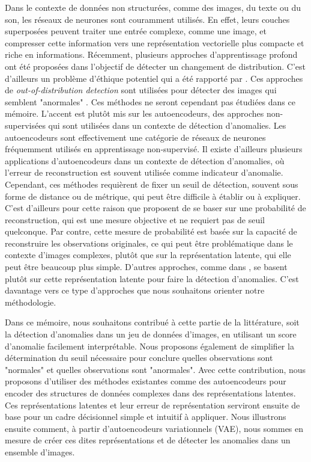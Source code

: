 Dans le contexte de données non structurées, comme des images, du texte ou du son, les réseaux de neurones sont couramment utilisés. En effet, leurs couches superposées peuvent traiter une entrée complexe, comme une image, et compresser cette information vers une représentation vectorielle plus compacte et riche en informations. Récemment, plusieurs approches d'apprentissage profond ont été proposées dans l'objectif de détecter un changement de distribution. C'est d'ailleurs un problème d'éthique potentiel qui a été rapporté par \cite{amodei2016concrete}. Ces approches de \textit{out-of-distribution detection} sont utilisées pour détecter des images qui semblent "anormales" \citep{ren2019likelihood}. Ces méthodes ne seront cependant pas étudiées dans ce mémoire. L'accent est plutôt mis sur les autoencodeurs, des approches non-supervisées qui sont utilisées dans un contexte de détection d'anomalies. Les autoencodeurs sont effectivement une catégorie de réseaux de neurones fréquemment utilisés en apprentissage non-supervisé. Il existe d'ailleurs plusieurs applications d'autoencodeurs dans un contexte de détection d'anomalies, où l'erreur de reconstruction est souvent utilisée comme indicateur d'anomalie. Cependant, ces méthodes requièrent de fixer un seuil de détection, souvent sous forme de distance ou de métrique, qui peut être difficile à établir ou à expliquer. C'est d'ailleurs pour cette raison que  \cite{An2015VariationalAB} proposent de se baser sur une probabilité de reconstruction, qui est une mesure objective et ne requiert pas de seuil quelconque. Par contre, cette mesure de probabilité est basée sur la capacité de reconstruire les observations originales, ce qui peut être problématique dans le contexte d'images complexes, plutôt que sur la représentation latente, qui elle peut être beaucoup plus simple. D'autres approches, comme dans \cite{chalapathy2018anomaly}, se basent plutôt sur cette représentation latente pour faire la détection d'anomalies. C'est davantage vers ce type d'approches que nous souhaitons orienter notre méthodologie. 

Dans ce mémoire, nous souhaitons contribué à cette partie de la littérature, soit la détection d'anomalies dans un jeu de données d'images, en utilisant un score d'anomalie facilement interprétable. Nous proposons également de simplifier la détermination du seuil nécessaire pour conclure quelles observations sont "normales" et quelles observations sont "anormales". Avec cette contribution, nous proposons d'utiliser des méthodes existantes comme des autoencodeurs  pour encoder des structures de données complexes dans des représentations latentes. Ces représentations latentes et leur erreur de représentation serviront ensuite de base pour un cadre décisionnel simple et intuitif à appliquer. Nous illustrons ensuite comment, à partir d'autoencodeurs variationnels (VAE), nous sommes en mesure de créer ces dites représentations et de détecter les anomalies dans un ensemble d'images.